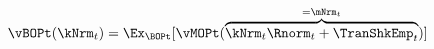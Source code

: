   \begin{equation}\begin{gathered}\begin{aligned}
\vBOPt(\kNrm_{t}) & = \Ex_{\BOPt}[\vMOPt(\overbrace{\kNrm_{t} \Rnorm_{t} + \TranShkEmp_{t}}^{=\mNrm_{t}})]  \label{eq:vBOPt}
      \end{aligned}\end{gathered}\end{equation}

